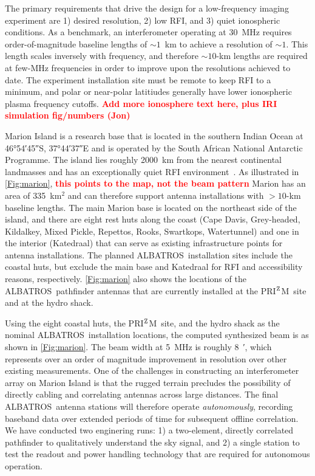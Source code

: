 \documentclass{ws-jai}
\def\albatros{ALBATROS}
\def\prizm{PRI$^{\rm Z}$M}
\newcommand{\attention}[1]{\textcolor{red}{\bf {#1}}}
\begin{document}
The primary requirements that drive the design for a low-frequency
imaging experiment are 1) desired resolution, 2) low RFI, and 3) quiet
ionospheric conditions.  As a benchmark, an interferometer operating
at 30~MHz requires order-of-magnitude baseline lengths of $\sim 1$~km
to achieve a resolution of $\sim 1$\degree.  This length scales
inversely with frequency, and therefore $\sim 10$-km lengths are
required at few-MHz frequencies in order to improve upon the
resolutions achieved to date.  The experiment installation site must
be remote to keep RFI to a minimum, and polar or near-polar latitiudes
generally have lower ionospheric plasma frequency cutoffs.
\attention{Add more ionosphere text here, plus IRI simulation
  fig/numbers (Jon)}

Marion Island is a research base that is located in the southern
Indian Ocean at \ang{46;54;45}S, \ang{37;44;37}E and is operated by
the South African National Antarctic Programme.  The island lies
roughly \SI{2000}{\kilo\metre} from the nearest continental landmasses
and has an exceptionally quiet RFI
environment~\citep{2019JAI.....850004P}.  As illustrated in
\autoref{Fig:marion}, \attention{this points to the map, not the beam pattern} Marion has an area of 335~km$^2$ and can
therefore support antenna installations with $>10$-km baseline
lengths.  The main Marion base is located on the northeast side of the
island, and there are eight rest huts along the coast (Cape Davis,
Grey-headed, Kildalkey, Mixed Pickle, Repettos, Rooks, Swartkops,
Watertunnel) and one in the interior (Katedraal) that can serve as
existing infrastructure points for antenna installations.  The planned
\albatros\ installation sites include the coastal huts, but exclude
the main base and Katedraal for RFI and accessibility reasons,
respectively.  \autoref{Fig:marion} also shows the locations of the
\albatros\ pathfinder antennas that are currently installed at the
\prizm\ site and at the hydro shack.

Using the eight coastal huts, the \prizm\ site, and the hydro shack as
the nominal \albatros\ installation locations, the computed
synthesized beam is as shown in \autoref{Fig:marion}.  The beam width
at 5~MHz is roughly \SI{8}{\arcminute}, which represents over an order
of magnitude improvement in resolution over other existing
measurements.  One of the challenges in constructing an interferometer
array on Marion Island is that the rugged terrain precludes the
possibility of directly cabling and correlating antennas across large
distances.  The final \albatros\ antenna stations will therefore
operate {\it autonomously}, recording baseband data over extended
periods of time for subsequent offline correlation.  We have conducted
two enginering runs: 1) a two-element, directly correlated pathfinder
to qualitatively understand the sky signal, and 2) a single station to
test the readout and power handling technology that are required for
autonomous operation.
\end{document}
